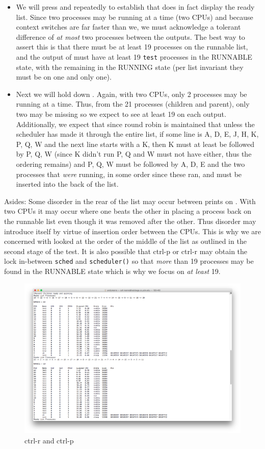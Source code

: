 \documentclass[11pt,letterpaper]{report}
\begin{document}
	\begin{itemize}
		\item We will press  and  repeatedly to establish that  does in fact display the ready list. Since two processes may be running at a time (two CPUs) and because context switches are far faster than we, 
			we must acknowledge a tolerant difference of \emph{at most} two processes between the outputs. The best way to assert this is that there must be at least 19 processes on the runnable list, and the output of  
			must have at least 19 {\tt test} processes in the RUNNABLE state, with the remaining in the RUNNING state (per list invariant they must be on one and only one).
		\item Next we will hold down . Again, with two CPUs, only 2 processes may be running at a time. Thus, from the 21 processes (children and parent), only two may be missing so we expect to see at least 19 on each output. 
		Additionally, we expect that since round robin is maintained that unless the scheduler has made it through the entire list, if some line is  A, D, E, J, H, K, P, Q, W and the next line starts with a K, then K must at least be 
		followed by P, Q, W (since K didn't run P, Q and W must not have either, thus the ordering remains) and P, Q, W must be followed by A, D, E and the two processes that \emph{were} running, in some order since these ran, and must be inserted into the back of the list.
	\end{itemize}
Asides: Some disorder in the rear of the list may occur between prints on . With two CPUs it may occur where one beats the other in placing a process back on the runnable list even though it was removed after the other. Thus disorder
may introduce itself by virtue of insertion order between the CPUs. This is why we are concerned with looked at the order of the middle of the list as outlined in the second stage of the test. It is also possible that ctrl-p or 
ctrl-r may obtain the lock in-between {\tt sched} and {\tt scheduler()} so that \emph{more} than 19 processes may be found in the RUNNABLE state which is why we focus on \emph{at least} 19.

\pagebreak

\begin{figure}[h]
\centering
\includegraphics[width=0.8\linewidth]{rr-1.png}
\caption{ctrl-r and ctrl-p}
\label{fig:1}
\end{figure}  
\end{document}
